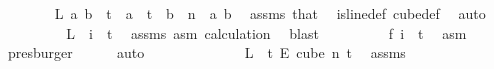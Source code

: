 \begin{isabellebody}
\ \ \ \ \ \ \isamarkupfalse%
\ {\isachardoublequoteopen}L\ a\ b\ {\isasymin}\ {\isacharbraceleft}{\kern0pt}{\isachardot}{\kern0pt}{\isachardot}{\kern0pt}{\isacharless}{\kern0pt}t{\isacharbraceright}{\kern0pt}{\isachardoublequoteclose}\ \ {\isachardoublequoteopen}a\ {\isacharless}{\kern0pt}\ t{\isachardoublequoteclose}\ \ {\isachardoublequoteopen}b\ {\isacharless}{\kern0pt}\ n{\isachardoublequoteclose}\ \ a\ b\ \isamarkupfalse%
\ assms{\isacharparenleft}{\kern0pt}{}{\isacharparenright}{\kern0pt}\ that\ \isamarkupfalse%
\ is{\isacharunderscore}{\kern0pt}line{\isacharunderscore}{\kern0pt}def\ cube{\isacharunderscore}{\kern0pt}def\ \isamarkupfalse%
\ auto\isanewline
\ \ \ \ \ \ \isamarkupfalse%
\ \isamarkupfalse%
\ {\isachardoublequoteopen}L\ {}\ i\ {\isasymin}\ {\isacharbraceleft}{\kern0pt}{\isachardot}{\kern0pt}{\isachardot}{\kern0pt}{\isacharless}{\kern0pt}t{\isacharbraceright}{\kern0pt}{\isachardoublequoteclose}\ \isamarkupfalse%
\ assms{\isacharparenleft}{\kern0pt}{}{\isacharparenright}{\kern0pt}\ asm\ calculation{\isacharparenleft}{\kern0pt}{}{\isacharparenright}{\kern0pt}\ \isamarkupfalse%
\ blast\isanewline
\ \ \ \ \ \ \isamarkupfalse%
\ \isamarkupfalse%
\ {\isachardoublequoteopen}{\isacharquery}{\kern0pt}f\ i\ {\isasymin}\ {\isacharbraceleft}{\kern0pt}{\isachardot}{\kern0pt}{\isachardot}{\kern0pt}{\isacharless}{\kern0pt}t{\isacharbraceright}{\kern0pt}{\isachardoublequoteclose}\ \isamarkupfalse%
\ asm\ \isamarkupfalse%
\ presburger\isanewline
\ \ \ \ \isamarkupfalse%
\ {\isacharparenleft}{\kern0pt}auto{\isacharparenright}{\kern0pt}\isanewline
\ \ \isacommand{{\isacharbraceright}{\kern0pt}}\isamarkupfalse%
\isanewline
\isanewline
\ \ \isamarkupfalse%
\isanewline
\ \ \isacommand{{\isacharbraceleft}{\kern0pt}}\isamarkupfalse%
\isanewline
\ \ \ \ \isamarkupfalse%
\ {\isachardoublequoteopen}L\ {\isasymin}\ {\isacharbraceleft}{\kern0pt}{\isachardot}{\kern0pt}{\isachardot}{\kern0pt}{\isacharless}{\kern0pt}t{\isacharbraceright}{\kern0pt}\ {\isasymrightarrow}\isactrlsub E\ {\isacharparenleft}{\kern0pt}cube\ n\ t{\isacharparenright}{\kern0pt}{\isachardoublequoteclose}\ \isamarkupfalse%
\ assms{\isacharparenleft}{\kern0pt}{}{\isacharparenright}{\kern0pt}\ \isamarkupfalse%

\end{isabellebody}

